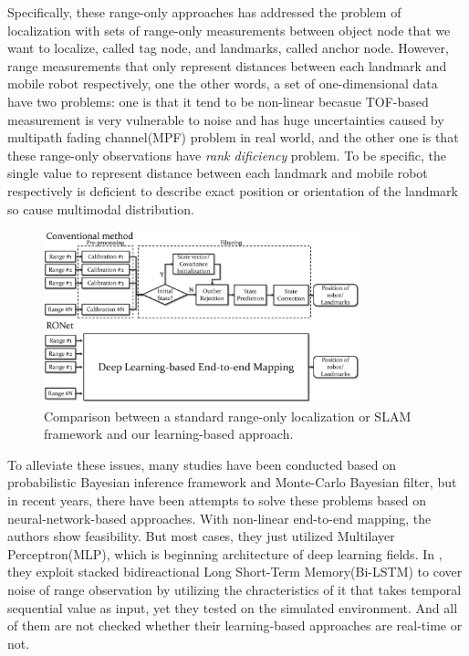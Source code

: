 \documentclass[letterpaper, 10 pt, conference]{ieeeconf}  %
\begin{document}
Specifically, these range-only approaches has addressed the problem of localization with sets of range-only measurements between object node that we want to localize, called tag node, and landmarks, called anchor node. However, range measurements that only represent distances between each landmark and mobile robot respectively, one the other words, a set of one-dimensional data have two problems:  one is that it tend to be non-linear becasue TOF-based measurement is very vulnerable to noise and has huge uncertainties caused by multipath fading channel(MPF) problem\cite{li2017novel} in real world, and the other one is that these range-only observations have \textit{rank dificiency} problem\cite{fabresse2018efficient}. To be specific, the single value to represent distance between each landmark and mobile robot respectively is deficient to describe exact position or orientation of the landmark so cause multimodal distribution\cite{gonzalez2009mobile}. 

\begin{figure}[h]
	
	\centering
	\includegraphics[height=5cm]{image/conventional_deep_comparsion}
	
	\label{fig:example}
	
	\caption{Comparison between a standard range-only localization or SLAM framework and our learning-based approach.}
	
\end{figure}

To alleviate these issues, many studies have been conducted based on probabilistic Bayesian inference framework and Monte-Carlo Bayesian filter, but in recent years, there have been attempts to solve these problems based on neural-network-based approaches\cite{rahman2009localization, abdelhadi2013efficient, kumar2016localization, lim2018effective}. With non-linear end-to-end mapping, the authors show feasibility. But most cases, they just utilized Multilayer Perceptron(MLP), which is beginning architecture of deep learning fields\cite{rahman2009localization, abdelhadi2013efficient, kumar2016localization}. In \cite{lim2018effective}, they exploit stacked bidireactional Long Short-Term Memory(Bi-LSTM) to cover noise of range observation by utilizing the chracteristics of it that takes temporal sequential value as input, yet they tested on the simulated environment. And all of them are not checked whether their learning-based approaches are real-time or not. 
\end{document}
